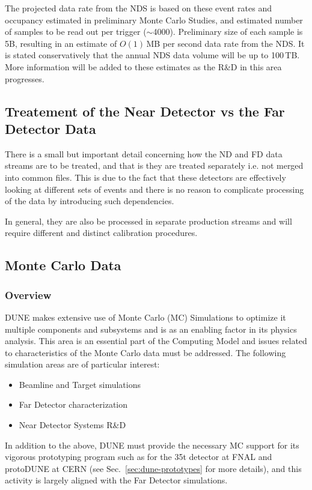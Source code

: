 \noindent
The projected data rate from the NDS is based on these event rates and occupancy estimated in preliminary Monte Carlo Studies,
and estimated number of samples to be read out per trigger ($\sim$4000). Preliminary size of each sample is 5B, resulting in an estimate
of $O(1)$\,MB per second data rate from the NDS. It is stated conservatively that the annual NDS data volume will be up to 100\,TB.
More information will be added to these estimates as the R\&D in this area progresses.

\subsection{Treatement of the Near Detector vs the Far Detector Data}
\label{sec:near-vs-far-data}
There is a small but important detail concerning how the ND and FD data streams are to be treated, and that is they are treated
separately i.e. not merged into common files.  This is due to the fact that these detectors are effectively looking at different sets
of events and there is no reason to complicate processing of the data by introducing such dependencies.

In general, they are also be processed in separate production streams and will require different and
distinct calibration procedures.

\subsection{Monte Carlo Data}
\label{sec:mc-data-estimates}
\subsubsection{Overview}
DUNE makes extensive use of Monte Carlo (MC) Simulations to optimize it multiple components and subsystems and is as an enabling factor in its physics
analysis. This area is an essential part of the Computing Model and issues related to characteristics of the Monte Carlo data must be addressed.
The following simulation areas are of particular interest:
\begin{itemize}
\item Beamline and Target simulations
\item Far Detector characterization
\item Near Detector Systems R\&D
\end{itemize}

\noindent
In addition to the above, DUNE must provide the necessary MC support for its vigorous prototyping program such as for the 35t detector
at FNAL and protoDUNE at CERN (see Sec.~\ref{sec:dune-prototypes} for more details), and this activity is largely aligned with the Far
Detector simulations.

